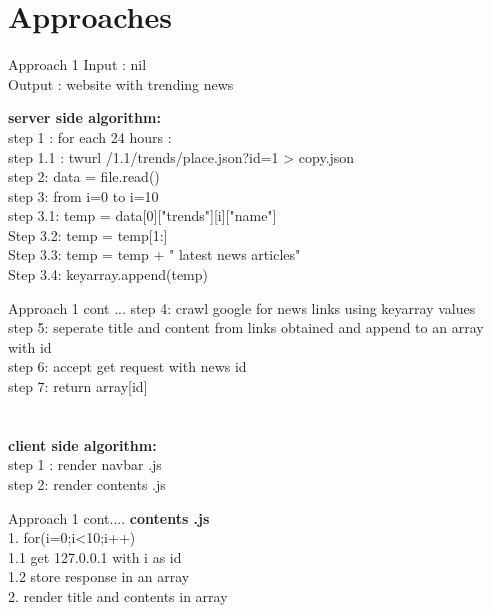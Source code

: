 \documentclass{beamer}
\begin{document}
	\section{Approaches}
	\begin{frame}{Approach 1}
		\footnotesize
	\Large{Input : nil \\
	Output :  website with trending news}
	
	\footnotesize
	\textbf{\Large{server side algorithm: }}\\
\Large{	step 1 :  for each 24 hours : \\
	\hspace{.2cm} step 1.1 : twurl /1.1/trends/place.json?id=1 > copy.json\\
	step 2:  data = file.read() \\
	step 3:  from i=0 to i=10 \\
	\hspace{.2cm}step 3.1: temp = data[0]["trends"][i]["name"]\\   
	\hspace{.2cm}Step 3.2:  temp = temp[1:]  \\
\hspace{.2cm}Step 3.3:  temp = temp + " latest news articles"\\
\hspace{.2cm}Step 3.4:  keyarray.append(temp)  \\
 }
		
	\end{frame}
	\begin{frame}{Approach 1 cont ...}
    \Large{	
    step 4: crawl google for news links using keyarray values\\
    step 5: seperate title and content from links obtained  and append to an array with id \\
    step 6: accept get request with news id\\
    step 7: return array[id]\\   }
    \\
    \\
	\footnotesize
	\textbf{\Large{client side algorithm: }}\\
	\Large{step 1 : render  navbar .js  \\	
	step 2:  render  contents .js \\}
\end{frame}
\begin{frame}{Approach 1 cont....}
    \Large{\vspace{5mm}
	\textbf{contents .js}\\
	\vspace{5mm}
	1. for(i=0;i<10;i++)\\
	\hspace{.2cm}1.1 get 127.0.0.1 with i as id\\
	\hspace{.2cm}1.2 store response in an array\\
	2. render title and contents in array}
    
\end{frame}
\end{document}

